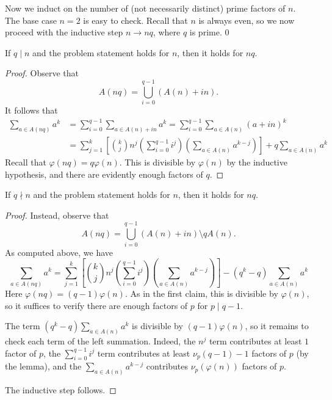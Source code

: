 Now we induct on the number of (not necessarily distinct) prime factors of $n$. The base case $n=2$ is easy to check. Recall that $n$ is always even, so we now proceed with the inductive step $n\to nq$, where $q$ is prime.
\setcounter{claim}0
\begin{claim}
    If $q\mid n$ and the problem statement holds for $n$, then it holds for $nq$.
\end{claim}
\begin{proof}
    Observe that \[A(nq)=\bigcup_{i=0}^{q-1}(A(n)+in).\]
    It follows that
    \begin{align*}
        \sum_{a\in A(nq)}a^k&=\sum_{i=0}^{q-1}\sum_{a\in A(n)+in}a^k
        =\sum_{i=0}^{q-1}\sum_{a\in A(n)}(a+in)^k\\
        &=\sum_{j=1}^k\left[\binom kjn^j\left(\sum_{i=0}^{q-1}i^j\right)\left(\sum_{a\in A(n)}a^{k-j}\right)\right]+q\sum_{a\in A(n)}a^k
    \end{align*}
    Recall that $\varphi(nq)=q\varphi(n)$. This is divisible by $\varphi(n)$ by the inductive hypothesis, and there are evidently enough factors of $q$.
\end{proof}
\begin{claim}
    If $q\nmid n$ and the problem statement holds for $n$, then it holds for $nq$.
\end{claim}
\begin{proof}
    Instead, observe that \[A(nq)=\bigcup_{i=0}^{q-1}(A(n)+in)\setminus qA(n).\]
    As computed above, we have
    \[\sum_{a\in A(nq)}a^k=\sum_{j=1}^k\left[\binom kjn^j\left(\sum_{i=0}^{q-1}i^j\right)\left(\sum_{a\in A(n)}a^{k-j}\right)\right]-\left(q^k-q\right)\sum_{a\in A(n)}a^k\]
    Here $\varphi(nq)=(q-1)\varphi(n)$. As in the first claim, this is divisible by $\varphi(n)$, so it suffices to verify there are enough factors of $p$ for $p\mid q-1$.

    The term $(q^k-q)\sum_{a\in A(n)}a^k$ is divisible by $(q-1)\varphi(n)$, so it remains to check each term of the left summation. Indeed, the $n^j$ term contributes at least $1$ factor of $p$, the $\sum_{i=0}^{q-1}i^j$ term contributes at least $\nu_p(q-1)-1$ factors of $p$ (by the lemma), and the $\sum_{a\in A(n)}a^{k-j}$ contributes $\nu_p(\varphi(n))$ factors of $p$.

    The inductive step follows.
\end{proof}

